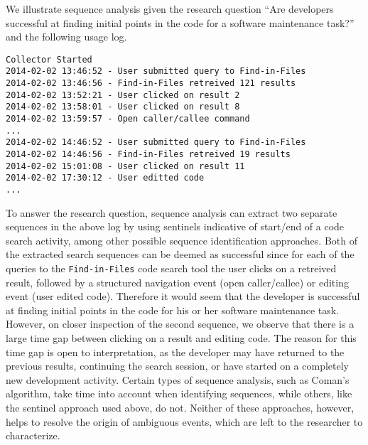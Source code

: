 We illustrate sequence analysis given the research question  ``Are developers successful at finding initial points in the code for a software maintenance task?'' and the following usage log.

\begin{verbatim}
Collector Started
2014-02-02 13:46:52 - User submitted query to Find-in-Files
2014-02-02 13:46:56 - Find-in-Files retreived 121 results
2014-02-02 13:52:21 - User clicked on result 2
2014-02-02 13:58:01 - User clicked on result 8
2014-02-02 13:59:57 - Open caller/callee command 
...
2014-02-02 14:46:52 - User submitted query to Find-in-Files
2014-02-02 14:46:56 - Find-in-Files retreived 19 results
2014-02-02 15:01:08 - User clicked on result 11
2014-02-02 17:30:12 - User editted code
...
\end{verbatim}

To answer the research question, sequence analysis can extract two separate sequences in the above log by using sentinels indicative of start/end of a code search activity, among other possible sequence identification approaches. Both of the extracted search sequences can be deemed as successful since for each of the queries to the {\tt Find-in-Files} code search tool the user clicks on a retreived result, followed by a structured navigation event (open caller/callee) or editing event (user edited code). Therefore it would seem that the developer is successful at finding initial points in the code for his or her software maintenance task. However, on closer inspection of the second sequence, we observe that there is a large time gap between clicking on a result and editing code. The reason for this time gap is open to interpretation, as the developer may have returned to the previous results, continuing the search session, or have started on a completely new development activity. Certain types of sequence analysis, such as Coman's algorithm, take time into account when identifying sequences, while others, like the sentinel approach used above, do not. Neither of these approaches, however, helps to resolve the origin of ambiguous events, which are left to the researcher to characterize.




